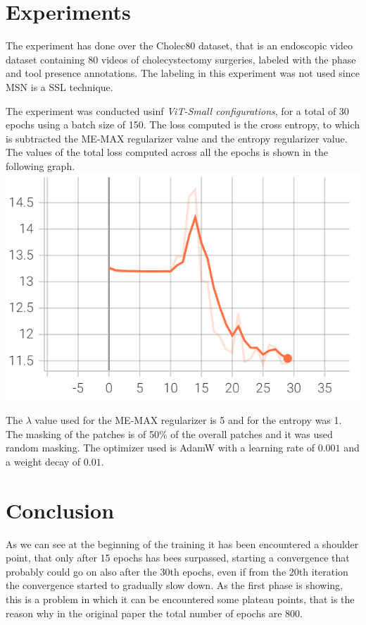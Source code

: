 \documentclass[column]{article}
\begin{document}
		
	\begin{multicols}{2}
		
	\section{Experiments}
	
	The experiment has done over the Cholec80 dataset, that is an endoscopic video dataset containing 80 videos of cholecystectomy surgeries, labeled with the phase and tool presence annotations. The labeling in this experiment was not used since MSN is a SSL technique.
	
	The experiment was conducted usinf \textit{ViT-Small configurations}, for a total of 30 epochs using a batch size of 150. The loss computed is the cross entropy, to which is subtracted the ME-MAX regularizer value and the entropy regularizer value. The values of the total loss computed across all the epochs is shown in the following graph. 
	\includegraphics[width=0.9\linewidth]{Images/screenshot002}
	
	The $\lambda$ value used for the ME-MAX regularizer is 5 and for the entropy was 1. The masking of the patches is of 50\% of the overall patches and it was used random masking. The optimizer used is AdamW with a learning rate of $0.001$ and a weight decay of $0.01$. 
	
	
	
	\section{Conclusion}
	
	As we can see at the beginning of the training it has been encountered a shoulder point, that only after 15 epochs has bees surpassed, starting a convergence that probably could go on also after the 30th epochs, even if from the 20th iteration the convergence started to gradually slow down. As the first phase is showing, this is a problem in which it can be encountered some plateau points, that is the reason why in the original paper the total number of epochs are 800. 
	

\end{multicols}
\end{document}
